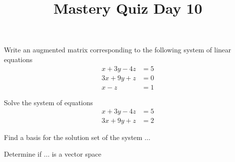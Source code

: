 \documentclass{sbgquiz}
\title{Mastery Quiz Day 10 }
\begin{document}
\begin{problem}[E1]
Write an augmented matrix corresponding to the following system of linear equations
\begin{align*}
x+3y-4z &= 5 \\
3x+9y+z &= 0 \\
x-z &= 1
\end{align*}
\end{problem}

\begin{problem}[E3]
Solve the system of equations
\begin{align*}
x+3y-4z &= 5 \\
3x+9y+z &= 2
\end{align*}
\end{problem}

\begin{problem}[E4]
Find a basis for the solution set of the system ...
\end{problem}

\begin{problem}[V1]
Determine if ... is a vector space
\end{problem}
\end{document}
